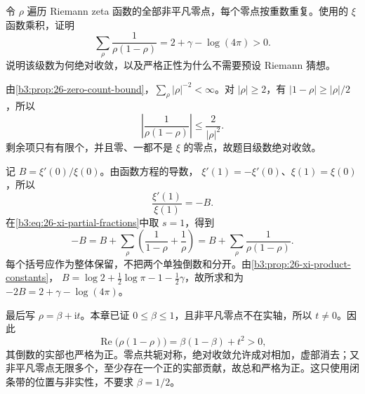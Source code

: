 \begin{optionalexercise}\label{b3:ex:26-8}
令 \(\rho\) 遍历 Riemann zeta 函数的全部非平凡零点，每个零点按重数重复。使用的 \(\xi\) 函数乘积，证明
\[
 \sum_\rho\frac1{\rho(1-\rho)}
 =2+\gamma-\log(4\pi)>0.
\]
说明该级数为何绝对收敛，以及严格正性为什么不需要预设 Riemann 猜想。
\end{optionalexercise}
\begin{solution}
由\cref{b3:prop:26-zero-count-bound}，\(\sum_\rho|\rho|^{-2}<\infty\)。对 \(|\rho|\ge2\)，有 \(|1-\rho|\ge|\rho|/2\)，所以
\[
 \left|\frac1{\rho(1-\rho)}\right|\le\frac2{|\rho|^2}.
\]
剩余项只有有限个，并且零、一都不是 \(\xi\) 的零点，故题目级数绝对收敛。

记 \(B=\xi'(0)/\xi(0)\)。由函数方程的导数，
\(\xi'(1)=-\xi'(0)\)、\(\xi(1)=\xi(0)\)，所以
\[
 \frac{\xi'(1)}{\xi(1)}=-B.
\]
在\eqref{b3:eq:26-xi-partial-fractions}中取 \(s=1\)，得到
\[
 -B=B+\sum_\rho\left(\frac1{1-\rho}+\frac1\rho\right)
    =B+\sum_\rho\frac1{\rho(1-\rho)}.
\]
每个括号应作为整体保留，不把两个单独倒数和分开。由\cref{b3:prop:26-xi-product-constants}，
\(B=\log2+\tfrac12\log\pi-1-\tfrac12\gamma\)，故所求和为
\(-2B=2+\gamma-\log(4\pi)\)。

最后写 \(\rho=\beta+\mathrm it\)。本章已证 \(0\le\beta\le1\)，且非平凡零点不在实轴，所以 \(t\ne0\)。因此
\[
 \operatorname{Re}\bigl(\rho(1-\rho)\bigr)
 =\beta(1-\beta)+t^2>0,
\]
其倒数的实部也严格为正。零点共轭对称，绝对收敛允许成对相加，虚部消去；又非平凡零点无限多个，至少存在一个正的实部贡献，故总和严格为正。这只使用闭条带的位置与非实性，不要求 \(\beta=1/2\)。
\end{solution}
